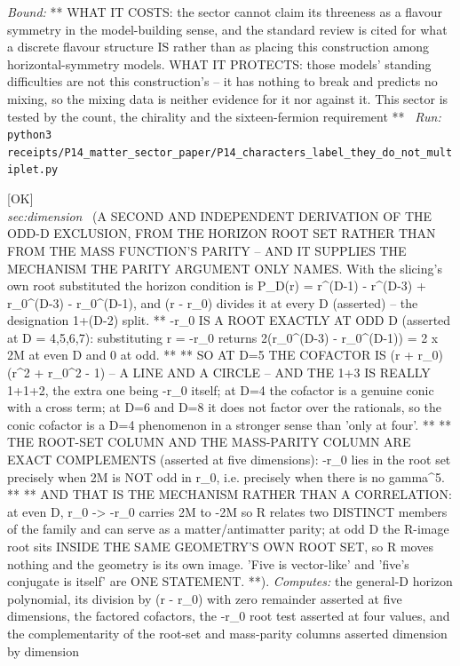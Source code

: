 \begin{description}
 \emph{Bound:} ** WHAT IT COSTS: the sector cannot claim its threeness as a flavour symmetry in the model-building sense, and the standard review is cited for what a discrete flavour structure IS rather than as placing this construction among horizontal-symmetry models. WHAT IT PROTECTS: those models' standing difficulties are not this construction's -- it has nothing to break and predicts no mixing, so the mixing data is neither evidence for it nor against it. This sector is tested by the count, the chirality and the sixteen-fermion requirement **
\ \emph{Run:} \texttt{python3 receipts/P14\_matter\_sector\_paper/P14\_characters\_label\_they\_do\_not\_multiplet.py}
\item[\label{rcpt:P14_odd_D_contains_its_own_image}\texttt{P14\_odd\_D\_contains\_its\_own\_image}]\hfill\textsf{[OK]}\\
\textit{sec:dimension} \ (A SECOND AND INDEPENDENT DERIVATION OF THE ODD-D EXCLUSION, FROM THE HORIZON ROOT SET RATHER THAN FROM THE MASS FUNCTION'S PARITY -- AND IT SUPPLIES THE MECHANISM THE PARITY ARGUMENT ONLY NAMES. With the slicing's own root substituted the horizon condition is P\_D(r) = r\textasciicircum{}(D-1) - r\textasciicircum{}(D-3) + r\_0\textasciicircum{}(D-3) - r\_0\textasciicircum{}(D-1), and (r - r\_0) divides it at every D (asserted) -- the designation 1+(D-2) split. ** -r\_0 IS A ROOT EXACTLY AT ODD D (asserted at D = 4,5,6,7): substituting r = -r\_0 returns 2(r\_0\textasciicircum{}(D-3) - r\_0\textasciicircum{}(D-1)) = 2 x 2M at even D and 0 at odd. ** ** SO AT D=5 THE COFACTOR IS (r + r\_0)(r\textasciicircum{}2 + r\_0\textasciicircum{}2 - 1) -- A LINE AND A CIRCLE -- AND THE 1+3 IS REALLY 1+1+2, the extra one being -r\_0 itself; at D=4 the cofactor is a genuine conic with a cross term; at D=6 and D=8 it does not factor over the rationals, so the conic cofactor is a D=4 phenomenon in a stronger sense than 'only at four'. ** ** THE ROOT-SET COLUMN AND THE MASS-PARITY COLUMN ARE EXACT COMPLEMENTS (asserted at five dimensions): -r\_0 lies in the root set precisely when 2M is NOT odd in r\_0, i.e. precisely when there is no gamma\textasciicircum{}5. ** ** AND THAT IS THE MECHANISM RATHER THAN A CORRELATION: at even D, r\_0 -> -r\_0 carries 2M to -2M so R relates two DISTINCT members of the family and can serve as a matter/antimatter parity; at odd D the R-image root sits INSIDE THE SAME GEOMETRY'S OWN ROOT SET, so R moves nothing and the geometry is its own image. 'Five is vector-like' and 'five's conjugate is itself' are ONE STATEMENT. **). 
\emph{Computes:} the general-D horizon polynomial, its division by (r - r\_0) with zero remainder asserted at five dimensions, the factored cofactors, the -r\_0 root test asserted at four values, and the complementarity of the root-set and mass-parity columns asserted dimension by dimension

\end{description}
